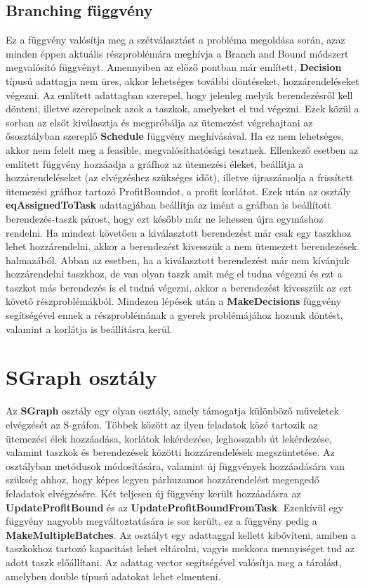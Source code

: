 \subsection{Branching függvény}
Ez a függvény valósítja meg a szétválasztást a probléma megoldása során, azaz minden éppen aktuális részproblémára meghívja a Branch and Bound módszert megvalósító függvényt.
Amennyiben az előző pontban már említett, \textbf{Decision} típusú adattagja nem üres, akkor lehetséges további döntéseket, hozzárendeléseket végezni.
Az említett adattagban szerepel, hogy jelenleg melyik berendezésről kell dönteni, illetve szerepelnek azok a taszkok, amelyeket el tud végezni.
Ezek közül a sorban az elsőt kiválasztja és megpróbálja az ütemezést végrehajtani az ősosztályban szereplő \textbf{Schedule} függvény meghívásával.
Ha ez nem lehetséges, akkor nem felelt meg a feasible, megvalósíthatósági tesztnek.
Ellenkező esetben az említett függvény hozzáadja a gráfhoz az ütemezési éleket, beállítja a hozzárendeléseket (az elvégzéshez szükséges időt), illetve újraszámolja a frissített ütemezési gráfhoz tartozó ProfitBoundot, a profit korlátot.
Ezek után az osztály \textbf{eqAssignedToTask} adattagjában beállítja az imént a gráfban is beállított berendezés-taszk párost, hogy ezt később már ne lehessen újra egymáshoz rendelni.
Ha mindezt követően a kiválasztott berendezést már csak egy taszkhoz lehet hozzárendelni, akkor a berendezést kivesszük a nem ütemezett berendezések halmazából.
Abban az esetben, ha a kiválasztott berendezést már nem kívánjuk hozzárendelni taszkhoz, de van olyan taszk amit még el tudna végezni és ezt a taszkot más berendezés is el tudná végezni, akkor a berendezést kivesszük az ezt követő részproblémákból.
Mindezen lépések után a \textbf{MakeDecisions} függvény segítségével ennek a részproblémának a gyerek problémájához hozunk döntést, valamint a korlátja is beállításra kerül.

\section{SGraph osztály}
Az \textbf{SGraph} osztály egy olyan osztály, amely támogatja különböző műveletek elvégzését az S-gráfon.
Többek között az ilyen feladatok közé tartozik az ütemezési élek hozzáadása, korlátok lekérdezése, leghosszabb út lekérdezése, valamint taszkok és berendezések közötti hozzárendelések megszüntetése.
Az osztályban metódusok módosítására, valamint új függvények hozzáadására van szükség ahhoz, hogy képes legyen párhuzamos hozzárendelést megengedő feladatok elvégzésére.
Két teljesen új függvény került hozzáadásra az \textbf{UpdateProfitBound} és az \textbf{UpdateProfitBoundFromTask}.
Ezenkívül egy függvény nagyobb megváltoztatására is sor került, ez a függvény pedig a \textbf{MakeMultipleBatches}.
Az osztályt egy adattaggal kellett kibővíteni, amiben a taszkokhoz tartozó kapacitást lehet eltárolni, vagyis mekkora mennyiséget tud az adott taszk előállítani.
Az adattag vector segítségével valósítja meg a tárolást, amelyben double típusú adatokat lehet elmenteni.

